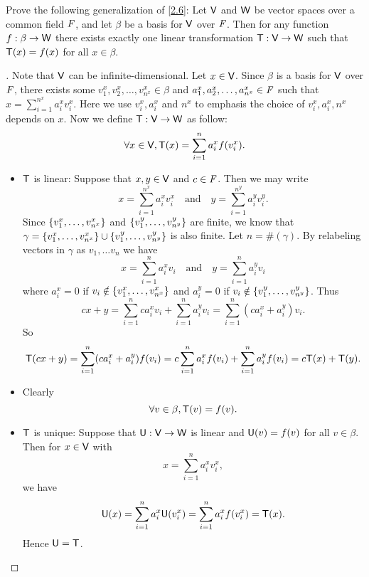 \begin{ex}\label{ex:2.1.34}
  Prove the following generalization of \cref{2.6}:
  Let \(\mathsf{V}\) and \(\mathsf{W}\) be vector spaces over a common field \(\mathit{F}\), and let \(\beta\) be a basis for \(\mathsf{V}\) over \(\mathit{F}\).
  Then for any function \(f : \beta \to \mathsf{W}\) there exists exactly one linear transformation \(\mathsf{T} : \mathsf{V} \to \mathsf{W}\) such that \(\mathsf{T}(x) = f(x)\) for all \(x \in \beta\).
\end{ex}

\begin{proof}[]
  Note that \(\mathsf{V}\) can be infinite-dimensional.
  Let \(x \in \mathsf{V}\).
  Since \(\beta\) is a basis for \(\mathsf{V}\) over \(\mathit{F}\), there exists some \(v_1^x, v_2^x, \dots, v_{n^x}^x \in \beta\) and \(a_1^x, a_2^x, \dots, a_{n^x}^x \in \mathit{F}\) such that \(x = \sum_{i = 1}^{n^x} a_i^x v_i^x\).
  Here we use \(v_i^x, a_i^x\) and \(n^x\) to emphasis the choice of \(v_i^x, a_i^x, n^x\) depends on \(x\).
  Now we define \(\mathsf{T} : \mathsf{V} \to \mathsf{W}\) as follow:
  \[
    \forall x \in \mathsf{V}, \mathsf{T}(x) = \sum_{i = 1}^n a_i^x f(v_i^x).
  \]
  \begin{itemize}
    \item \(\mathsf{T}\) is linear:
          Suppose that \(x, y \in \mathsf{V}\) and \(c \in \mathit{F}\).
          Then we may write
          \[
            x = \sum_{i = 1}^{n^x} a_i^x v_i^x \quad \text{and} \quad y = \sum_{i = 1}^{n^y} a_i^y v_i^y.
          \]
          Since \(\left\lbrace v_1^x, \dots, v_{n^x}^x\right\rbrace\) and \(\left\lbrace v_1^y, \dots, v_{n^y}^y\right\rbrace\) are finite, we know that \(\gamma = \left\lbrace v_1^x, \dots, v_{n^x}^x\right\rbrace \cup \left\lbrace v_1^y, \dots, v_{n^y}^y\right\rbrace\) is also finite.
          Let \(n = \#(\gamma)\).
          By relabeling vectors in \(\gamma\) as \(v_1, \dots v_n\) we have
          \[
            x = \sum_{i = 1}^n a_i^x v_i \quad \text{and} \quad y = \sum_{i = 1}^n a_i^y v_i
          \]
          where \(a_i^x = 0\) if \(v_i \notin \left\lbrace v_1^x, \dots, v_{n^x}^x\right\rbrace\) and \(a_i^y = 0\) if \(v_i \notin \left\lbrace v_1^y, \dots, v_{n^y}^y\right\rbrace\).
          Thus
          \[
            cx + y = \sum_{i = 1}^n c a_i^x v_i + \sum_{i = 1}^n a_i^y v_i = \sum_{i = 1}^n (c a_i^x + a_i^y) v_i.
          \]
          So
          \[
            \mathsf{T}(cx + y) = \sum_{i = 1}^n (c a_i^x + a_i^y) f(v_i) = c \sum_{i = 1}^n a_i^x f(v_i) + \sum_{i = 1}^n a_i^y f(v_i) = c \mathsf{T}(x) + \mathsf{T}(y).
          \]
    \item Clearly
          \[
            \forall v \in \beta, \mathsf{T}(v) = f(v).
          \]
    \item \(\mathsf{T}\) is unique:
          Suppose that \(\mathsf{U} : \mathsf{V} \to \mathsf{W}\) is linear and \(\mathsf{U}(v) = f(v)\) for all \(v \in \beta\).
          Then for \(x \in \mathsf{V}\) with
          \[
            x = \sum_{i = 1}^n a_i^x v_i^x,
          \]
          we have
          \[
            \mathsf{U}(x) = \sum_{i = 1}^n a_i^x \mathsf{U}(v_i^x) = \sum_{i = 1}^n a_i^x f(v_i^x) = \mathsf{T}(x).
          \]
          Hence \(\mathsf{U} = \mathsf{T}\).
  \end{itemize}
\end{proof}

